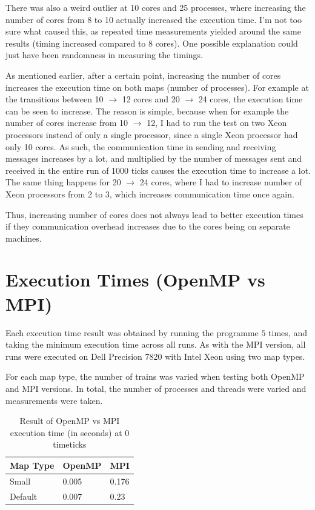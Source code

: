 \documentclass[12pt]{article}
\begin{document}
\bigbreak \noindent There was also a weird outlier at 10 cores and 25 processes, where increasing the number of cores from 8 to 10 actually increased the execution time. I'm not too sure what caused this, as repeated time measurements yielded around the same results (timing increased compared to 8 cores). One possible explanation could just have been randomness in measuring the timings.

\bigbreak \noindent As mentioned earlier, after a certain point, increasing the number of cores increases the execution time on both maps (number of processes). For example at the transitions between 10 $\rightarrow$ 12 cores and 20 $\rightarrow$ 24 cores, the execution time can be seen to increase. The reason is simple, because when for example the number of cores increase from 10 $\rightarrow$ 12, I had to run the test on two Xeon processors instead of only a single processor, since a single Xeon processor had only 10 cores. As such, the communication time in sending and receiving messages increases by a lot, and multiplied by the number of messages sent and received in the entire run of 1000 ticks causes the execution time to increase a lot. The same thing happens for 20 $\rightarrow$ 24 cores, where I had to increase number of Xeon processors from 2 to 3, which increases communication time once again.

\bigbreak \noindent Thus, increasing number of cores does not always lead to better execution times if they communication overhead increases due to the cores being on separate machines.

\section{Execution Times (OpenMP vs MPI)}

Each execution time result was obtained by running the programme $5$ times, and taking the minimum execution time across all runs. As with the MPI version, all runs were executed on Dell Precision 7820 with Intel Xeon using two map types.

\bigbreak \noindent For each map type, the number of trains was varied when testing both OpenMP and MPI versions. In total, the number of processes and threads were varied and measurements were taken.

\begin{table}[]
\begin{tabular}{|l|l|l|}
\hline
Map Type & OpenMP & MPI   \\ \hline
Small    & 0.005  & 0.176 \\ \hline
Default  & 0.007  & 0.23  \\ \hline
\end{tabular}
\caption{Result of OpenMP vs MPI execution time (in seconds) at 0 timeticks}
\end{table}
\end{document}
